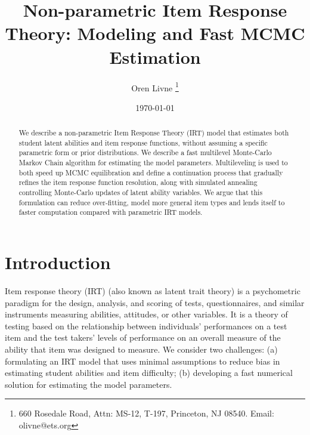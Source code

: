 \documentclass{article}
\title{Non-parametric Item Response Theory: Modeling and Fast MCMC Estimation}
\author[1]{Oren Livne \thanks{660 Rosedale Road, Attn: MS-12, T-197, Princeton, NJ 08540. Email: olivne@ets.org}}
\affil[1]{Educational Testing Service}
\date{\today}
\begin{document}
\maketitle

\begin{abstract}
We describe a non-parametric Item Response Theory (IRT) model that estimates both student latent abilities and item response functions, without assuming a specific parametric form or prior distributions. We describe a fast multilevel Monte-Carlo Markov Chain algorithm for estimating the model parameters. Multileveling is used to both speed up MCMC equilibration and define a continuation process that gradually refines the item response function resolution, along with simulated annealing controlling Monte-Carlo updates of latent ability variables. We argue that this formulation can reduce over-fitting, model more general item types and lends itself to faster computation compared with parametric IRT models.
\end{abstract}

\section{Introduction}
Item response theory (IRT) (also known as latent trait theory) is a psychometric paradigm for the design, analysis, and scoring of tests, questionnaires, and similar instruments measuring abilities, attitudes, or other variables. It is a theory of testing based on the relationship between individuals' performances on a test item and the test takers' levels of performance on an overall measure of the ability that item was designed to measure. We consider two challenges: (a) formulating an IRT model that uses minimal assumptions to reduce bias in estimating student abilities and item difficulty; (b) developing a fast numerical solution for estimating the model parameters.
\end{document}
